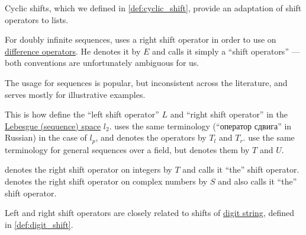 \begin{comments}
  \item Cyclic shifts, which we defined in \cref{def:cyclic_shift}, provide an adaptation of shift operators to lists.

  \item For doubly infinite sequences, \textcite[77]{Stanley2012EnumerativeCombinatoricsVol1} uses a right shift operator in order to use  on \hyperref[def:finite_difference_operator]{difference operators}. He denotes it by \( E \) and calls it simply a \enquote{shift operators} --- both conventions are unfortunately ambiguous for us.

  The usage for sequences is popular, but inconsistent across the literature, and serves mostly for illustrative examples.

  This is how \textcite[exerc. 7.26]{FabianEtAl2001FunctionalAnalysis} define the \enquote{left shift operator} \( L \) and \enquote{right shift operator} in the \hyperref[def:lebesgue_space]{Lebesgue (sequence) space} \( l_2 \). \Textcite[example 1.3.3]{Хелемский2014ФункциональныйАнализ} uses the same terminology (\enquote{оператор сдвига} in Russian) in the case of \( l_p \), and denotes the operators by \( T_l \) and \( T_r \). \Textcite[exerc. 2.1.21]{FriedbergInselSpence2018LinearAlgebra} use the same terminology for general sequences over a field, but denotes them by \( T \) and \( U \).

  \textcite[84]{Lang2002Algebra} denotes the right shift operator on integers by \( T \) and calls it \enquote{the} shift operator. \Textcite[347]{Rudin1987RealAndComplexAnalysis} denotes the right shift operator on complex numbers by \( S \) and also calls it \enquote{the} shift operator.

  \item Left and right shift operators are closely related to shifts of \hyperref[def:positional_number_system]{digit string}, defined in \cref{def:digit_shift}.
\end{comments}

